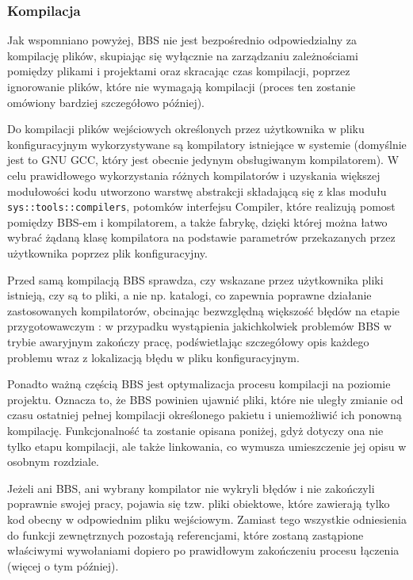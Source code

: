 \subsubsection{Kompilacja}
Jak wspomniano powyżej, BBS nie jest bezpośrednio odpowiedzialny za kompilację plików, skupiając się wyłącznie na zarządzaniu zależnościami pomiędzy plikami i projektami oraz skracając czas kompilacji, poprzez ignorowanie plików, które nie wymagają kompilacji (proces ten zostanie omówiony bardziej szczegółowo później).

Do kompilacji plików wejściowych określonych przez użytkownika w pliku konfiguracyjnym wykorzystywane są kompilatory istniejące w systemie (domyślnie jest to GNU GCC, który jest obecnie jedynym obsługiwanym kompilatorem). W celu prawidłowego wykorzystania różnych kompilatorów i uzyskania większej modułowości kodu utworzono warstwę abstrakcji składającą się z klas modułu \texttt{sys::tools::compilers}, potomków interfejsu Compiler, które realizują pomost pomiędzy BBS-em i kompilatorem, a także fabrykę, dzięki której można łatwo wybrać żądaną klasę kompilatora na podstawie parametrów przekazanych przez użytkownika poprzez plik konfiguracyjny.

Przed samą kompilacją BBS sprawdza, czy wskazane przez użytkownika pliki istnieją, czy są to pliki, a nie np. katalogi, co zapewnia poprawne działanie zastosowanych kompilatorów, obcinając bezwzględną większość błędów na etapie przygotowawczym : w przypadku wystąpienia jakichkolwiek problemów BBS w trybie awaryjnym zakończy pracę, podświetlając szczegółowy opis każdego problemu wraz z lokalizacją błędu w pliku konfiguracyjnym.

Ponadto ważną częścią BBS jest optymalizacja procesu kompilacji na poziomie projektu. Oznacza to, że BBS powinien ujawnić pliki, które nie uległy zmianie od czasu ostatniej pełnej kompilacji określonego pakietu i uniemożliwić ich ponowną kompilację. Funkcjonalność ta zostanie opisana poniżej, gdyż dotyczy ona nie tylko etapu kompilacji, ale także linkowania, co wymusza umieszczenie jej opisu w osobnym rozdziale.

Jeżeli ani BBS, ani wybrany kompilator nie wykryli błędów i nie zakończyli poprawnie swojej pracy, pojawia się tzw. pliki obiektowe, które zawierają tylko kod obecny w odpowiednim pliku wejściowym. Zamiast tego wszystkie odniesienia do funkcji zewnętrznych pozostają referencjami, które zostaną zastąpione właściwymi wywołaniami dopiero po prawidłowym zakończeniu procesu łączenia (więcej o tym później).

